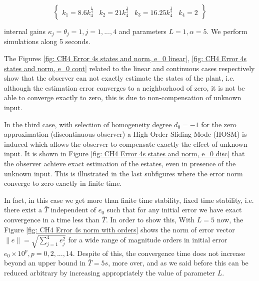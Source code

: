 \documentclass[11pt,letterpaper,twoside,openright]{report}
\providecommand{\norm}[1]{\lVert#1\rVert}
\begin{document}
\begin{equation}
	\begin{Bmatrix}
		k_{1}=8.6k_{4}^{\frac{1}{4}} & k_{2}=21k_{4}^{\frac{1}{2}} & k_{3}=16.25k_{4}^{\frac{1}{3}} & k_{4}=2
	\end{Bmatrix}
\end{equation}

internal gains $\kappa_j=\theta_j=1, j=1,...,4$ and parameters $L=1,\alpha=5$. We perform simulations along 5 seconds.

The Figures \ref{fig: CH4 Error 4s states and norm, e_0 linear}, \ref{fig: CH4 Error 4s states and norm, e_0 cont} related to the linear and continuous cases respectively show that the observer can not exactly estimate the states of the plant, i.e. although the estimation error converges to a neighborhood of zero, it is not be able to converge exactly to zero, this is due to non-compensation of unknown input.

In the third case, with selection of homogeneity degree $d_0=-1$ for the zero approximation (discontinuous observer) a High Order Sliding Mode (HOSM) is induced which allows the observer to compensate exactly the effect of unknown input. It is shown in Figure \ref{fig: CH4 Error 4s states and norm, e_0 disc} that the observer achieve exact estimation of the estates, even in presence of the unknown input. This is illustrated in the last subfigures where the error norm converge to zero exactly in finite time.

In fact, in this case we get more than finite time stability, fixed time stability, i.e. there exist a $\bar{T}$ independent of $e_0$ such that for any initial error we have exact convergence in a time less than $\bar{T}$. In order to show this, With $L=5$ now, the Figure \ref{fig: CH4 Error 4s norm with orders} shows the norm of error vector $\norm{e}=\sqrt{\sum_{j=1}^{4}e_j^2}$ for a wide range of magnitude orders in initial error $e_0\times 10^p,p=0,2,...,14$. Despite of this, the convergence time does not increase beyond an upper bound in $\bar{T}=5s$, more over, and as we said before this can be reduced arbitrary by increasing appropriately the value of parameter $L$.
\end{document}
